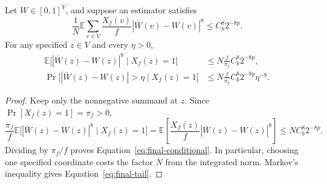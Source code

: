 \begin{lemma}\label{lem:final-majority}
Let $W\in[0,1]^V$, and suppose an estimator satisfies
\[
\frac1N\mathbb E\sum_{v\in V}\frac{X_f(v)}f
 |\bar W(v)-W(v)|^8\le C_b^8 2^{-8p}.
\]
For any specified $z\in V$ and every $\eta>0$,
\begin{align}
\mathbb E\bigl[|\bar W(z)-W(z)|^8\mid X_f(z)=1\bigr]
 &\le N\frac f{\pi_f}C_b^8 2^{-8p},
 \label{eq:final-conditional}\\
\Pr\bigl[|\bar W(z)-W(z)|>\eta\mid X_f(z)=1\bigr]
 &\le N\frac f{\pi_f}C_b^8 2^{-8p}\eta^{-8}.
 \label{eq:final-tail}
\end{align}
\end{lemma}

\begin{proof}
Keep only the nonnegative summand at $z$. Since
$\Pr[X_f(z)=1]=\pi_f>0$,
\[
 \frac{\pi_f}{f}
 \mathbb E\bigl[|\bar W(z)-W(z)|^8\mid X_f(z)=1\bigr]
 =\mathbb E\!\left[\frac{X_f(z)}f|\bar W(z)-W(z)|^8\right]
 \le N C_b^8 2^{-8p}.
\]
Dividing by $\pi_f/f$ proves
Equation~\eqref{eq:final-conditional}. In particular, choosing one
specified coordinate costs the factor $N$ from the integrated norm.
Markov's inequality gives Equation~\eqref{eq:final-tail}.
\end{proof}

